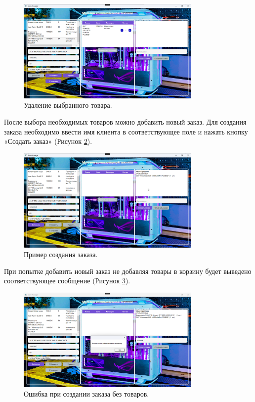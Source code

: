 \documentclass[12pt]{article}
\numberwithin{listing}{section}
\numberwithin{figure}{section}
\begin{document}
\begin{figure}[H]
	\centering
	\includegraphics[width=0.8\textwidth]{fig/Рисунок 6.3.png}
	\caption{Удаление выбранного товара.}
	\label{fig:remove_from_cart}
\end{figure}

После выбора необходимых товаров можно добавить новый заказ. Для создания заказа необходимо ввести имя клиента в соответствующее поле и нажать кнопку «Создать заказ» (Рисунок \ref{fig:create_order}).

\begin{figure}[H]
	\centering
	\includegraphics[width=0.8\textwidth]{fig/Рисунок 6.4.png}
	\caption{Пример создания заказа.}
	\label{fig:create_order}
\end{figure}

При попытке добавить новый заказ не добавляя товары в корзину будет выведено соответствующее сообщение (Рисунок \ref{fig:order_error}).

\begin{figure}[H]
	\centering
	\includegraphics[width=0.8\textwidth]{fig/Рисунок 6.5.png}
	\caption{Ошибка при создании заказа без товаров.}
	\label{fig:order_error}
\end{figure}
\end{document}
